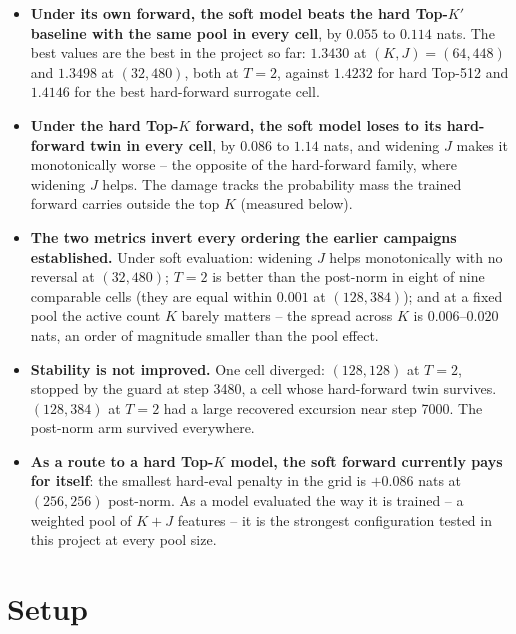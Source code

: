 \documentclass[11pt,a4paper]{article}
\newcommand{\Kp}{K'}
\begin{document}
\begin{itemize}[leftmargin=1.4em]
\item \textbf{Under its own forward, the soft model beats the hard Top-$\Kp$
baseline with the same pool in every cell}, by $0.055$ to $0.114$ nats. The
best values are the best in the project so far: $1.3430$ at $(K,J)=(64,448)$
and $1.3498$ at $(32,480)$, both at $T=2$, against $1.4232$ for hard Top-512
and $1.4146$ for the best hard-forward surrogate cell.

\item \textbf{Under the hard Top-$K$ forward, the soft model loses to its
hard-forward twin in every cell}, by $0.086$ to $1.14$ nats, and widening $J$
makes it monotonically worse -- the opposite of the hard-forward family, where
widening $J$ helps. The damage tracks the probability mass the trained
forward carries outside the top $K$ (measured below).

\item \textbf{The two metrics invert every ordering the earlier campaigns
established.} Under soft evaluation: widening $J$ helps monotonically with no
reversal at $(32,480)$; $T=2$ is better than the post-norm in eight of nine
comparable cells (they are equal within $0.001$ at $(128,384)$); and at a
fixed pool the active count $K$ barely matters -- the spread across $K$ is
$0.006$--$0.020$ nats, an order of magnitude smaller than the pool effect.

\item \textbf{Stability is not improved.} One cell diverged: $(128,128)$ at
$T=2$, stopped by the guard at step 3480, a cell whose hard-forward twin
survives. $(128,384)$ at $T=2$ had a large recovered excursion near step
7000. The post-norm arm survived everywhere.

\item \textbf{As a route to a hard Top-$K$ model, the soft forward currently
pays for itself}: the smallest hard-eval penalty in the grid is $+0.086$
nats at $(256,256)$ post-norm. As a model evaluated the way it is trained --
a weighted pool of $K{+}J$ features -- it is the strongest configuration
tested in this project at every pool size.
\end{itemize}

\section{Setup}
\end{document}
